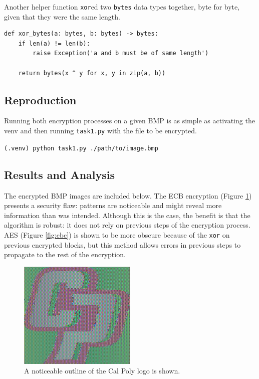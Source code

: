 \documentclass[11pt]{article}
\begin{document}
Another helper function {\tt xor}ed two {\tt bytes} data types together, byte for byte, given that they were the same length.

\begin{lstlisting}
def xor_bytes(a: bytes, b: bytes) -> bytes:
    if len(a) != len(b):
        raise Exception('a and b must be of same length')
    
    return bytes(x ^ y for x, y in zip(a, b))
\end{lstlisting}

\subsection*{Reproduction}

Running both encryption processes on a given BMP is as simple as activating the venv and then running \verb|task1.py| with the file to be encrypted.

\verb|(.venv) python task1.py ./path/to/image.bmp|

\subsection*{Results and Analysis}

The encrypted BMP images are included below. The ECB encryption (Figure \ref{fig:ecb}) presents a security flaw: patterns are noticeable and might reveal more information than was intended. Although this is the case, the benefit is that the algorithm is robust: it does not rely on previous steps of the encryption process. AES (Figure \ref{fig:cbc}) is shown to be more obscure because of the \verb|xor| on previous encrypted blocks, but this method allows errors in previous steps to propagate to the rest of the encryption.

\begin{figure}[!ht]
	\centering
	\includegraphics[width=0.5\textwidth]{./assets/ecb_encrypted.jpg}
	\caption{A noticeable outline of the Cal Poly logo is shown.}
	\label{fig:ecb}
\end{figure}
\end{document}
